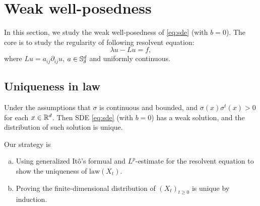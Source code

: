 \chapter{Weak well-posedness}
In this section, we study the weak well-posedness of
\eqref{eq:sde} (with \(b=0\)). 
The core is to study the regularity of following resolvent equation: 
\begin{equation}\label{eq:resolvent2}
    \lambda u - L u =f, 
\end{equation}
where $L u=a_{ij}\partial_{ij}u$, $a\in {\mathbb S}_\delta^d$ and uniformly continuous. 
	
\section{Uniqueness in law}
	\begin{theorem}\label{thm:SV}
		 Under the assumptions that $\sigma$ is continuous and bounded, and $\sigma(x)\sigma^t(x)>0$ for each $x\in {\mathbb R}^d$. Then SDE  \eqref{eq:sde} (with \(b=0\)) has a weak solution, and the distribution of such solution is unique. 
	\end{theorem}
	
	Our strategy is 
	\begin{enumerate}[(a)]
		\item Using generalized It\^o's formual and $L^p$-estimate for the  resolvent equation to show the uniqueness of $\mathrm{law} (X_t)$. 
		\item  Proving the finite-dimensional distribution of $(X_t)_{t\geq 0}$ is unique  by induction. 
	\end{enumerate}
	
